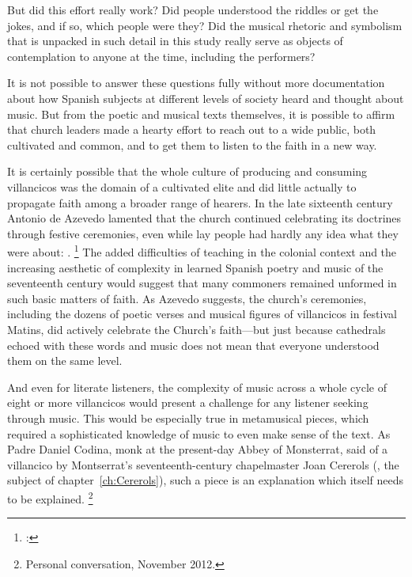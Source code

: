 But did this effort really work?
Did people understood the riddles or get the jokes, and if so, which people were they? 
Did the musical rhetoric and symbolism that is unpacked in such detail in this study really serve as objects of contemplation to anyone at the time, including the performers?

It is not possible to answer these questions fully without more documentation about how Spanish subjects at different levels of society heard and thought about music.
But from the poetic and musical texts themselves, it is possible to affirm that church leaders made a hearty effort to reach out to a wide public, both cultivated and common, and to get them to listen to the faith in a new way.

It is certainly possible that the whole culture of producing and consuming villancicos was the domain of a cultivated elite and did little actually to propagate faith among a broader range of hearers.
In the late sixteenth century Antonio de Azevedo lamented that the church continued celebrating its doctrines through festive ceremonies, even while lay people had hardly any idea what they were about:
.%
	\footnote{%
	\autocite[27]{Azevedo:Catecismo}:
	}
The added difficulties of teaching in the colonial context and the increasing aesthetic of complexity in learned Spanish poetry and music of the seventeenth century would suggest that many commoners remained unformed in such basic matters of faith.
As Azevedo suggests, the church's ceremonies, including the dozens of poetic verses and musical figures of villancicos in festival Matins, did actively celebrate the Church's faith---but just because cathedrals echoed with these words and music does not mean that everyone understood them on the same level.

And even for literate listeners, the complexity of music across a whole cycle of eight or more villancicos would present a challenge for any listener seeking  through music.
This would be especially true in metamusical pieces, which required a sophisticated knowledge of music to even make sense of the text.
As Padre Daniel Codina, monk at the present-day Abbey of Monsterrat, said of a villancico by Montserrat's seventeenth-century chapelmaster Joan Cererols (, the subject of chapter~\ref{ch:Cererols}), such a piece is an explanation which itself needs to be explained.%
	\footnote{%
	Personal conversation, November 2012.
	}

